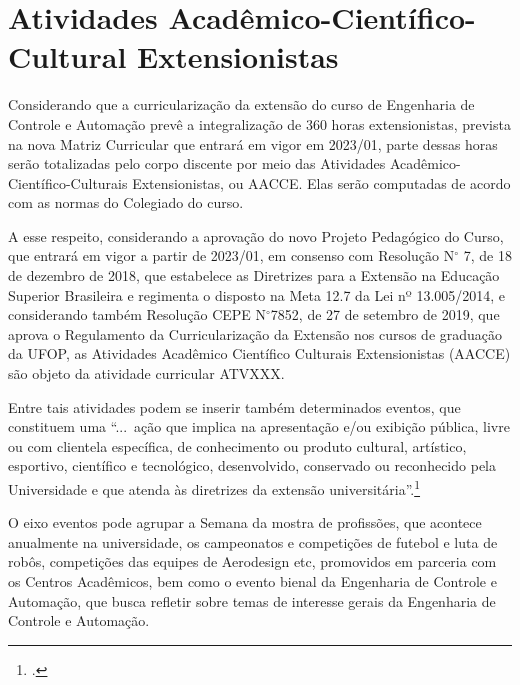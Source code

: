 \documentclass[
	12pt,				%
	openright,			%
	oneside,			%
	a4paper,			%
	english,			%
	brazil				%
	]{abntex2}
\begin{document}
\section{Atividades Acadêmico-Científico-Cultural Extensionistas}

Considerando que a curricularização da extensão do curso de Engenharia de Controle e Automação prevê a integralização de 360 horas extensionistas, prevista na nova Matriz Curricular que entrará em vigor em 2023/01, parte dessas horas serão totalizadas pelo corpo discente por meio das Atividades Acadêmico-Científico-Culturais Extensionistas, ou AACCE.
Elas serão computadas de acordo com as normas do Colegiado do curso.

A esse respeito, considerando a aprovação do novo Projeto Pedagógico do Curso, que entrará em vigor a partir de 2023/01, em consenso com Resolução N$^\circ$ 7, de 18 de dezembro de 2018, que estabelece as Diretrizes para a Extensão na Educação Superior Brasileira e regimenta o disposto na Meta 12.7 da Lei nº 13.005/2014, e considerando também Resolução CEPE N$^\circ$7852, de 27 de setembro de 2019, que aprova o Regulamento da Curricularização da Extensão nos cursos de graduação da UFOP, as Atividades Acadêmico Científico Culturais Extensionistas (AACCE) são objeto da atividade curricular ATVXXX.

Entre tais atividades podem se inserir também determinados eventos, que constituem uma ``...~ação que implica na apresentação e/ou exibição pública, livre ou com clientela específica, de conhecimento ou produto cultural, artístico, esportivo, científico e tecnológico, desenvolvido, conservado ou reconhecido pela Universidade e que atenda às diretrizes da extensão universitária''.\footcite{manual-ppc-ufop}

O eixo eventos pode agrupar a Semana da mostra de profissões, que acontece anualmente na universidade, os campeonatos e competições de futebol e luta de robôs, competições das equipes de Aerodesign etc, promovidos em parceria com os Centros Acadêmicos, bem como o evento bienal da Engenharia de Controle e Automação, que busca refletir sobre temas de interesse gerais da Engenharia de Controle e Automação.
\end{document}
